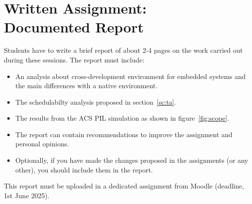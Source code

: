 \chapter*{Written Assignment: \\\vspace{7mm} Documented Report}

Students have to write a brief report of about 2-4 pages
on the work carried out during these sessions.
The report must include:

\begin{itemize}
	\item An analysis about cross-development environment for embedded systems and the main differences with a native environment.
	\item The schedulabilty analysis proposed in section~\ref{sc:ta}.
	\item The results from the ACS PIL simulation as shown in figure~\ref{fig:scope}.
	\item The report can contain recommendations to improve the assignment and personal opinions.
	\item Optionally, if you have made the changes proposed in the assignments (or any other), you should include them in the report.
\end{itemize}

This report must be uploaded in a dedicated assignment from Moodle (deadline, 1st June 2025).
